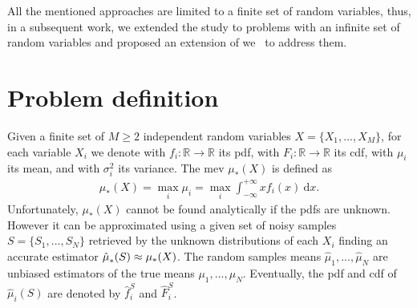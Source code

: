 All the mentioned approaches are limited to a finite set of random variables, thus, in a subsequent work, we extended the study to problems with an infinite set of random variables and proposed an extension of \gls{we}~\cite{deramo2017maximum} to address them.

\section{Problem definition}
Given a finite set of $M \geq 2$ independent random variables $X = \lbrace X_{1}, ..., X_{M} \rbrace$, for each variable $X_i$ we denote with $f_i : \mathbb{R} \rightarrow \mathbb{R}$ its \gls{pdf}, with $F_i : \mathbb{R} \rightarrow \mathbb{R}$ its \gls{cdf}, with $\mu_i$ its mean, and with $\sigma^2_i$ its variance.
The \gls{mev} $\mu_{*}(X)$ is defined as
\begin{align}\label{E:maxExp}
\mu_{*}(X) = \max_{i} \mu_{i} = \max_{i} \int_{-\infty}^{+\infty}xf_i(x)~\mathrm{d}x.
\end{align}
Unfortunately, $\mu_{*}(X)$ cannot be found analytically if the \glspl{pdf} are unknown.
However it can be approximated using a given set of noisy samples $S = \lbrace S_{1}, ..., S_{N} \rbrace$ retrieved by the unknown distributions of each $X_{i}$ finding an accurate estimator $\hat\mu_*^{}(S) \approx \mu_{*}(X)$. 
The random samples means $\hat{\mu}_{1}, ..., \hat{\mu}_{N}$ are unbiased estimators of the true means $\mu_{1}, ..., \mu_{N}$.
Eventually, the \gls{pdf} and \gls{cdf} of $\hat{\mu}_{i}(S)$ are denoted by $\hat f_i^S$ and $\hat F_i^S$.

